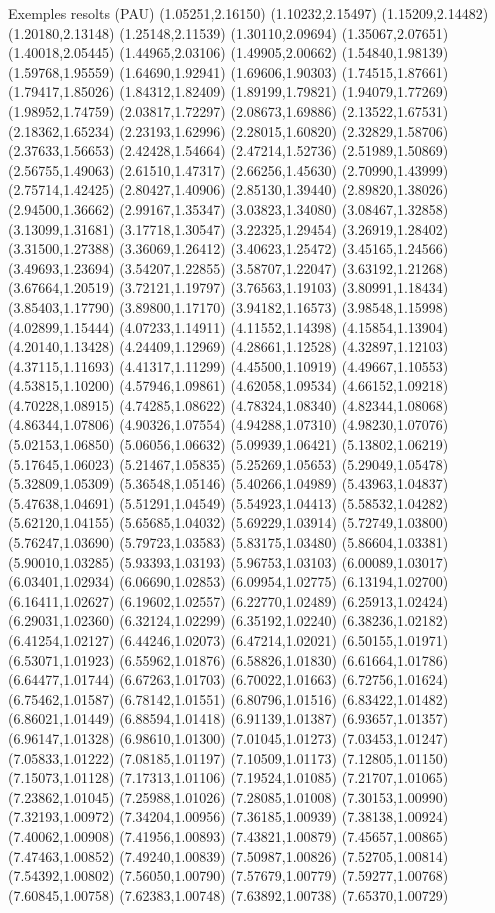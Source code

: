 \documentclass[11pt,a4paper]{article}
\begin{document}
\begin{fmex}{Exemples resolts (PAU)}
(1.05251,2.16150) (1.10232,2.15497) (1.15209,2.14482) (1.20180,2.13148) (1.25148,2.11539) (1.30110,2.09694) (1.35067,2.07651) (1.40018,2.05445) (1.44965,2.03106) (1.49905,2.00662) (1.54840,1.98139) (1.59768,1.95559) (1.64690,1.92941) (1.69606,1.90303) (1.74515,1.87661) (1.79417,1.85026) (1.84312,1.82409) (1.89199,1.79821) (1.94079,1.77269) (1.98952,1.74759) (2.03817,1.72297) (2.08673,1.69886) (2.13522,1.67531) (2.18362,1.65234) (2.23193,1.62996) (2.28015,1.60820) (2.32829,1.58706) (2.37633,1.56653) (2.42428,1.54664) (2.47214,1.52736) (2.51989,1.50869) (2.56755,1.49063) (2.61510,1.47317) (2.66256,1.45630) (2.70990,1.43999) (2.75714,1.42425) (2.80427,1.40906) (2.85130,1.39440) (2.89820,1.38026) (2.94500,1.36662) (2.99167,1.35347) (3.03823,1.34080) (3.08467,1.32858) (3.13099,1.31681) (3.17718,1.30547) (3.22325,1.29454) (3.26919,1.28402) (3.31500,1.27388) (3.36069,1.26412) (3.40623,1.25472) (3.45165,1.24566) (3.49693,1.23694) (3.54207,1.22855) (3.58707,1.22047) (3.63192,1.21268) (3.67664,1.20519) (3.72121,1.19797) (3.76563,1.19103) (3.80991,1.18434) (3.85403,1.17790) (3.89800,1.17170) (3.94182,1.16573) (3.98548,1.15998) (4.02899,1.15444) (4.07233,1.14911) (4.11552,1.14398) (4.15854,1.13904) (4.20140,1.13428) (4.24409,1.12969) (4.28661,1.12528) (4.32897,1.12103) (4.37115,1.11693) (4.41317,1.11299) (4.45500,1.10919) (4.49667,1.10553) (4.53815,1.10200) (4.57946,1.09861) (4.62058,1.09534) (4.66152,1.09218) (4.70228,1.08915) (4.74285,1.08622) (4.78324,1.08340) (4.82344,1.08068) (4.86344,1.07806) (4.90326,1.07554) (4.94288,1.07310) (4.98230,1.07076) (5.02153,1.06850) (5.06056,1.06632) (5.09939,1.06421) (5.13802,1.06219) (5.17645,1.06023) (5.21467,1.05835) (5.25269,1.05653) (5.29049,1.05478) (5.32809,1.05309) (5.36548,1.05146) (5.40266,1.04989) (5.43963,1.04837) (5.47638,1.04691) (5.51291,1.04549) (5.54923,1.04413) (5.58532,1.04282) (5.62120,1.04155) (5.65685,1.04032) (5.69229,1.03914) (5.72749,1.03800) (5.76247,1.03690) (5.79723,1.03583) (5.83175,1.03480) (5.86604,1.03381) (5.90010,1.03285) (5.93393,1.03193) (5.96753,1.03103) (6.00089,1.03017) (6.03401,1.02934) (6.06690,1.02853) (6.09954,1.02775) (6.13194,1.02700) (6.16411,1.02627) (6.19602,1.02557) (6.22770,1.02489) (6.25913,1.02424) (6.29031,1.02360) (6.32124,1.02299) (6.35192,1.02240) (6.38236,1.02182) (6.41254,1.02127) (6.44246,1.02073) (6.47214,1.02021) (6.50155,1.01971) (6.53071,1.01923) (6.55962,1.01876) (6.58826,1.01830) (6.61664,1.01786) (6.64477,1.01744) (6.67263,1.01703) (6.70022,1.01663) (6.72756,1.01624) (6.75462,1.01587) (6.78142,1.01551) (6.80796,1.01516) (6.83422,1.01482) (6.86021,1.01449) (6.88594,1.01418) (6.91139,1.01387) (6.93657,1.01357) (6.96147,1.01328) (6.98610,1.01300) (7.01045,1.01273) (7.03453,1.01247) (7.05833,1.01222) (7.08185,1.01197) (7.10509,1.01173) (7.12805,1.01150) (7.15073,1.01128) (7.17313,1.01106) (7.19524,1.01085) (7.21707,1.01065) (7.23862,1.01045) (7.25988,1.01026) (7.28085,1.01008) (7.30153,1.00990) (7.32193,1.00972) (7.34204,1.00956) (7.36185,1.00939) (7.38138,1.00924) (7.40062,1.00908) (7.41956,1.00893) (7.43821,1.00879) (7.45657,1.00865) (7.47463,1.00852) (7.49240,1.00839) (7.50987,1.00826) (7.52705,1.00814) (7.54392,1.00802) (7.56050,1.00790) (7.57679,1.00779) (7.59277,1.00768) (7.60845,1.00758) (7.62383,1.00748) (7.63892,1.00738) (7.65370,1.00729) 
\end{fmex}
\end{document}
